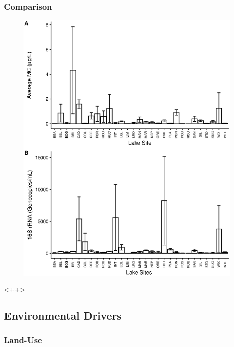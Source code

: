 \begin{frame}
	\frametitle{Comparison}
	\begin{figure}
		\includegraphics[width=\textwidth, height=\textheight]{../figures/responsecombine.eps}
	\end{figure}
\end{frame}

<++>
\subsection{Environmental Drivers}
\begin{frame}
	\frametitle{Land-Use}
		
\end{frame}



